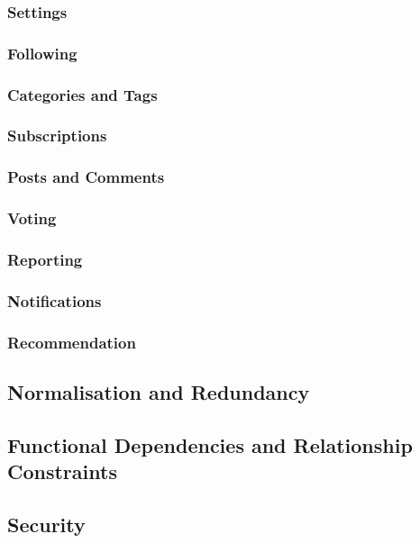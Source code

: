 \subsubsection{Settings}

\subsubsection{Following}

\subsubsection{Categories and Tags}

\subsubsection{Subscriptions}

\subsubsection{Posts and Comments}

\subsubsection{Voting}

\subsubsection{Reporting}

\subsubsection{Notifications}

\subsubsection{Recommendation}

\subsection{Normalisation and Redundancy}
\label{SubSection:Database_Normalisation}

\subsection{Functional Dependencies and Relationship Constraints}
\label{SubSection:Database_Constraints}

\subsection{Security}
\label{SubSection:Database_Security}
